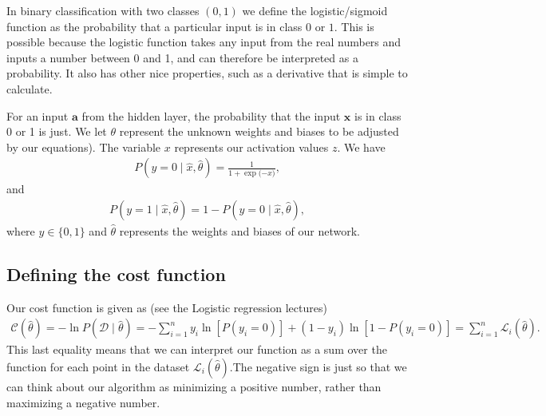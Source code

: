 \documentclass[letterpaper,10pt,english]{sphinxmanual}
\begin{document}
In binary classification with two classes \((0, 1)\) we define the
logistic/sigmoid function as the probability that a particular input
is in class \(0\) or \(1\).  This is possible because the logistic
function takes any input from the real numbers and inputs a number
between 0 and 1, and can therefore be interpreted as a probability. It
also has other nice properties, such as a derivative that is simple to
calculate.

For an input \(\boldsymbol{a}\) from the hidden layer, the probability that the input \(\boldsymbol{x}\)
is in class 0 or 1 is just. We let \(\theta\) represent the unknown weights and biases to be adjusted by our equations). The variable \(x\)
represents our activation values \(z\). We have
\begin{equation*}
\begin{split}
P(y = 0 \mid \hat{x}, \hat{\theta}) = \frac{1}{1 + \exp{(- \hat{x}})} ,
\end{split}
\end{equation*}
and
\begin{equation*}
\begin{split}
P(y = 1 \mid \hat{x}, \hat{\theta}) = 1 - P(y = 0 \mid \hat{x}, \hat{\theta}) ,
\end{split}
\end{equation*}
where \(y \in \{0, 1\}\)  and \(\hat{\theta}\) represents the weights and biases
of our network.


\subsection{Defining the cost function}
\label{\detokenize{chapter6:defining-the-cost-function}}
Our cost function is given as (see the Logistic regression lectures)
\begin{equation*}
\begin{split}
\mathcal{C}(\hat{\theta}) = - \ln P(\mathcal{D} \mid \hat{\theta}) = - \sum_{i=1}^n
y_i \ln[P(y_i = 0)] + (1 - y_i) \ln [1 - P(y_i = 0)] = \sum_{i=1}^n \mathcal{L}_i(\hat{\theta}) .
\end{split}
\end{equation*}
This last equality means that we can interpret our  function as a sum over the  function
for each point in the dataset \(\mathcal{L}_i(\hat{\theta})\).The negative sign is just so that we can think about our algorithm as minimizing a positive number, rather
than maximizing a negative number.
\end{document}
